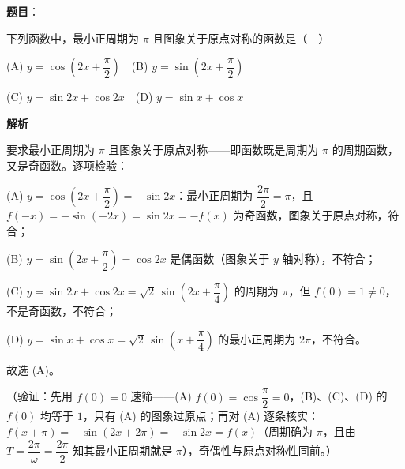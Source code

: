 \begin{answer}

\textbf{题目}：

下列函数中，最小正周期为 \(\pi\) 且图象关于原点对称的函数是（　）

(A) \(y=\cos\left(2x+\dfrac{\pi}{2}\right)\)　(B) \(y=\sin\left(2x+\dfrac{\pi}{2}\right)\)

(C) \(y=\sin 2x+\cos 2x\)　(D) \(y=\sin x+\cos x\)

\textbf{解析}

要求最小正周期为 \(\pi\) 且图象关于原点对称——即函数既是周期为 \(\pi\) 的周期函数，又是奇函数。逐项检验：

(A) \(y=\cos\left(2x+\dfrac{\pi}{2}\right)=-\sin 2x\)：最小正周期为 \(\dfrac{2\pi}{2}=\pi\)，且 \(f(-x)=-\sin(-2x)=\sin 2x=-f(x)\) 为奇函数，图象关于原点对称，符合；

(B) \(y=\sin\left(2x+\dfrac{\pi}{2}\right)=\cos 2x\) 是偶函数（图象关于 \(y\) 轴对称），不符合；

(C) \(y=\sin 2x+\cos 2x=\sqrt{2}\,\sin\left(2x+\dfrac{\pi}{4}\right)\) 的周期为 \(\pi\)，但 \(f(0)=1\neq0\)，不是奇函数，不符合；

(D) \(y=\sin x+\cos x=\sqrt{2}\,\sin\left(x+\dfrac{\pi}{4}\right)\) 的最小正周期为 \(2\pi\)，不符合。

故选 (A)。

（验证：先用 \(f(0)=0\) 速筛——(A) \(f(0)=\cos\dfrac{\pi}{2}=0\)，(B)、(C)、(D) 的 \(f(0)\) 均等于 \(1\)，只有 (A) 的图象过原点；再对 (A) 逐条核实：\(f(x+\pi)=-\sin(2x+2\pi)=-\sin 2x=f(x)\)（周期确为 \(\pi\)，且由 \(T=\dfrac{2\pi}{\omega}=\dfrac{2\pi}{2}\) 知其最小正周期就是 \(\pi\)），奇偶性与原点对称性同前。）


\end{answer}
